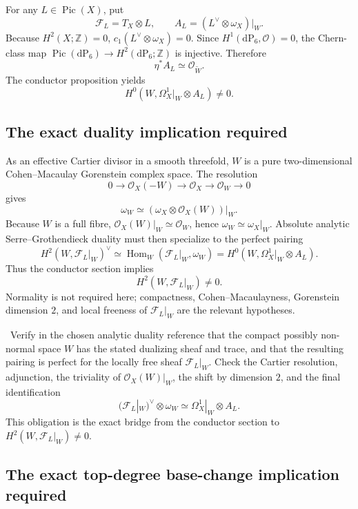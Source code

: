 For any $L\in\operatorname{Pic}(X)$, put
\[
 \mathcal F_L=T_X\otimes L,
 \qquad
 A_L=(L^\vee\otimes\omega_X)|_W.
\]
Because $H^2(X;\mathbb Z)=0$, $c_1(L^\vee\otimes\omega_X)=0$.
Since $H^1(\mathrm{dP}_6,\mathcal O)=0$, the Chern-class map
$\operatorname{Pic}(\mathrm{dP}_6)\to H^2(\mathrm{dP}_6;\mathbb Z)$
is injective. Therefore
\[
 \eta^*A_L\simeq\mathcal O_{\widetilde W}.
\]
The conductor proposition yields
\[
 H^0(W,\Omega_X^1|_W\otimes A_L)\ne0.
\]

\subsection{The exact duality implication required}

As an effective Cartier divisor in a smooth threefold, $W$ is a pure
two-dimensional Cohen--Macaulay Gorenstein complex space. The resolution
\[
0\longrightarrow\mathcal O_X(-W)\longrightarrow\mathcal O_X
 \longrightarrow\mathcal O_W\longrightarrow0
\]
gives
\[
 \omega_W\simeq(\omega_X\otimes\mathcal O_X(W))|_W.
\]
Because $W$ is a full fibre,
$\mathcal O_X(W)|_W\simeq\mathcal O_W$, hence
$\omega_W\simeq\omega_X|_W$. Absolute analytic
Serre--Grothendieck duality must then specialize to the perfect pairing
\[
 H^2(W,\mathcal F_L|_W)^\vee
 \simeq
 \operatorname{Hom}_W(\mathcal F_L|_W,\omega_W)
 =
 H^0(W,\Omega_X^1|_W\otimes A_L).
\]
Thus the conductor section implies
\[
 H^2(W,\mathcal F_L|_W)\ne0.
\]
Normality is not required here; compactness, Cohen--Macaulayness,
Gorenstein dimension $2$, and local freeness of $\mathcal F_L|_W$ are the
relevant hypotheses.

\begin{obligation}\label{obl:duality}
\Open\ Verify in the chosen analytic duality reference that the compact
possibly non-normal space $W$ has the stated dualizing sheaf and trace, and
that the resulting pairing is perfect for the locally free sheaf
$\mathcal F_L|_W$. Check the Cartier resolution, adjunction, the triviality
of $\mathcal O_X(W)|_W$, the shift by dimension $2$, and the final
identification
\[
(\mathcal F_L|_W)^\vee\otimes\omega_W
 \simeq \Omega_X^1|_W\otimes A_L.
\]
This obligation is the exact bridge from the conductor section to
$H^2(W,\mathcal F_L|_W)\ne0$.
\end{obligation}

\subsection{The exact top-degree base-change implication required}

